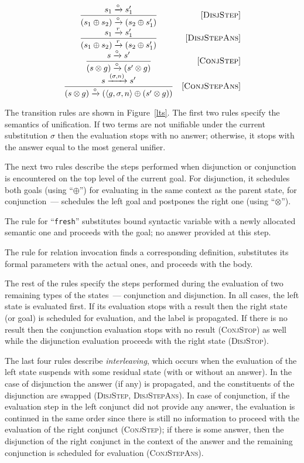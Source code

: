 \begin{figure*}
\[\begin{array}{cr}
    \dfrac{s_1 \xrightarrow{\circ} s'_1}{(s_1 \oplus s_2) \xrightarrow{\circ} (s_2 \oplus s'_1)} &\mbox{[\textsc{DisjStep}]}\\
    \dfrac{s_1 \xrightarrow{r} s'_1}{(s_1 \oplus s_2) \xrightarrow{r} (s_2 \oplus s'_1)} &\mbox{[\textsc{DisjStepAns}]}\\
    \dfrac{s \xrightarrow{\circ} s'}{(s \otimes g) \xrightarrow{\circ} (s' \otimes g)} &\mbox{[\textsc{ConjStep}]}\\
    \dfrac{s \xrightarrow{(\sigma, n)} s'}{(s \otimes g) \xrightarrow{\circ} (\left<{g, \sigma, n}\right> \oplus (s' \otimes g))} & \mbox{[\textsc{ConjStepAns}]} 
  \end{array}
  \]
  \caption{Operational semantics of interleaving search}
  \label{lts}
\end{figure*}

The transition rules are shown in Figure~\ref{lts}. The first two rules specify the semantics of unification. If two terms are not unifiable under the current substitution
$\sigma$ then the evaluation stops with no answer; otherwise, it stops with the answer equal to the most general unifier.

The next two rules describe the steps performed when disjunction or conjunction is encountered on the top level of the current goal. For disjunction, it schedules both goals (using ``$\oplus$'') for
evaluating in the same context as the parent state, for conjunction~--- schedules the left goal and postpones the right one (using ``$\otimes$'').

The rule for ``\lstinline|fresh|'' substitutes bound syntactic variable with a newly allocated semantic one and proceeds with the goal; no answer provided at this step.

The rule for relation invocation finds a corresponding definition, substitutes its formal parameters with the actual ones, and proceeds with the body.

The rest of the rules specify the steps performed during the evaluation of two remaining types of the states~--- conjunction and disjunction. In all cases, the left state
is evaluated first. If its evaluation stops with a result then the right state (or goal) is scheduled for evaluation, and the label is propagated. If there is no result then
the conjunction evaluation stops with no result (\textsc{ConjStop}) as well while the disjunction evaluation proceeds with the right state (\textsc{DisjStop}).

The last four rules describe \emph{interleaving}, which occurs when the evaluation of the left state suspends with some residual state (with or without an answer). In the case of disjunction
the answer (if any) is propagated, and the constituents of the disjunction are swapped (\textsc{DisjStep}, \textsc{DisjStepAns}). In case of conjunction, if the evaluation step in
the left conjunct did not provide any answer, the evaluation is continued in the same order since there is still no information to proceed with the evaluation of the right
conjunct (\textsc{ConjStep}); if there is some answer, then the disjunction of the right conjunct in the context of the answer and the remaining conjunction is
scheduled for evaluation (\textsc{ConjStepAns}).

